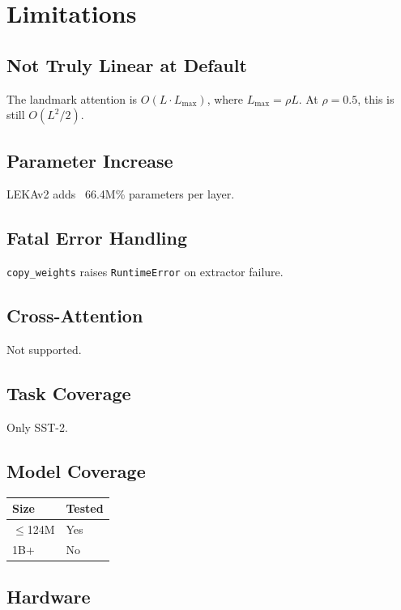 \section{Limitations}

\subsection{Not Truly Linear at Default}

The landmark attention is $O(L \cdot L_\text{max})$, where $L_\text{max} = \rho L$. 
At $\rho = 0.5$, this is still $O(L^2/2)$.

\subsection{Parameter Increase}

LEKAv2 adds ~66.4M\% parameters per layer.

\subsection{Fatal Error Handling}

\texttt{copy\_weights} raises \texttt{RuntimeError} on extractor failure.

\subsection{Cross-Attention}

Not supported.

\subsection{Task Coverage}

Only SST-2.

\subsection{Model Coverage}

\begin{table}[H]
\centering
\small
\begin{tabular}{ll}
\toprule
\textbf{Size} & \textbf{Tested} \\
\midrule
$\le$124M & Yes \\
1B+ & No \\
\bottomrule
\end{tabular}
\end{table}

\subsection{Hardware}

